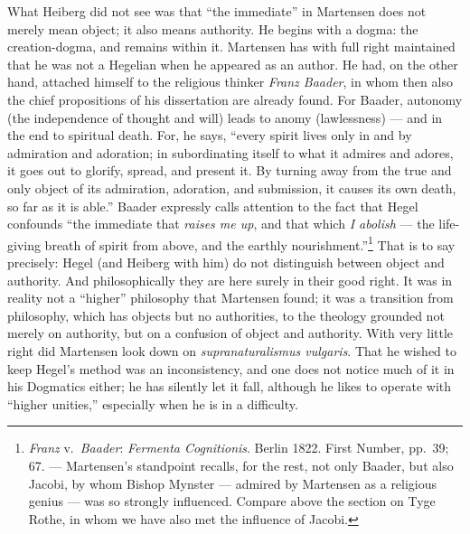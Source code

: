 \documentclass[12pt,a4paper]{book}
\newcommand{\opage}[1]{\marginnote{\footnotesize\textit{[#1]}}}
\begin{document}
What Heiberg did not see was that ``the immediate'' in Martensen does not merely mean object; it
also means authority. He begins with a dogma: the creation-dogma, and remains within it. Martensen
has with full right maintained that he was not a Hegelian when he appeared as an author. He had, on
the other hand, attached himself to the religious thinker \emph{Franz Baader}, in whom then also the chief
propositions of \opage{141}his dissertation are already found. For Baader, autonomy (the independence of
thought and will) leads to anomy (lawlessness) --- and in the end to spiritual death. For, he says,
``every spirit lives only in and by admiration and adoration; in subordinating itself to what it
admires and adores, it goes out to glorify, spread, and present it. By turning away from the true
and only object of its admiration, adoration, and submission, it causes its own death, so far as it
is able.'' Baader expressly calls attention to the fact that Hegel confounds ``the immediate that
\emph{raises me up}, and that which \emph{I abolish} --- the life-giving breath of spirit from
above, and the earthly nourishment.''\footnote{\emph{Franz} v.\ \emph{Baader}: \emph{Fermenta Cognitionis}.
Berlin 1822. First Number, pp.~39; 67. --- Martensen's standpoint recalls, for the rest, not only
Baader, but also Jacobi, by whom Bishop Mynster --- admired by Martensen as a religious genius ---
was so strongly influenced. Compare above the section on Tyge Rothe, in whom we have also met the
influence of Jacobi.} That is to say precisely: Hegel (and Heiberg with him) do not distinguish
between object and authority. And philosophically they are here surely in their good right. It was
in reality not a ``higher'' philosophy that Martensen found; it was a transition from philosophy,
which has objects but no authorities, to the theology grounded not merely on authority, but on a
confusion of object and authority. With very little right did Martensen look down on
\emph{supranaturalismus vulgaris}. That he wished to keep Hegel's method was an inconsistency, and
one does not notice much of it in his Dogmatics either; he has silently let it fall, although he
likes to operate with ``higher unities,'' especially when he is in a difficulty.
\end{document}

